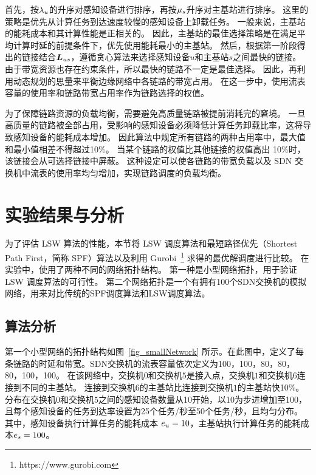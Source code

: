 首先，按${\lambda}_{u}$的升序对感知设备进行排序，再按${\mu}_{s}$升序对主基站进行排序。
这里的策略是优先从计算任务到达速度较慢的感知设备上卸载任务。
一般来说，主基站的能耗成本和其计算性能是正相关的。
因此，主基站的最佳选择策略是在满足平均计算时延的前提条件下，优先使用能耗最小的主基站。
然后，根据第一阶段得出的链接结合$\boldsymbol{L}_{us}$，遵循贪心算法来选择感知设备$u$和主基站$s$之间最快的链接。 
由于带宽资源也存在约束条件，所以最快的链路不一定是最佳选择。
因此，再利用动态规划的思量来平衡边缘网络中各链路的带宽占用。
在这一步中，使用流表容量的使用率和链路带宽占用率作为链路选择的权值。

为了保障链路资源的负载均衡，需要避免高质量链路被提前消耗完的窘境。
一旦高质量的链路被全部占用，受影响的感知设备必须降低计算任务卸载比率，这将导致感知设备的能耗成本增加。
因此算法中规定所有链路的两种占用率中，最大值和最小值相差不得超过10\%。
当某个链路的权值比其他链接的权值高出 10\%时，该链接会从可选择链接中屏蔽。
这种设定可以使各链路的带宽负载以及 SDN 交换机中流表的使用率均匀增加，实现链路调度的负载均衡。




\section{实验结果与分析}

为了评估 LSW 算法的性能，本节将 LSW 调度算法和最短路径优先（Shortest Path First，简称 SPF）算法以及利用 Gurobi~\footnote{https://www.gurobi.com} 求得的最优解调度进行比较。
在实验中，使用了两种不同的网络拓扑结构。
第一种是小型网络拓扑，用于验证 LSW 调度算法的可行性。
第二个网络拓扑是一个有拥有100个SDN交换机的模拟网络，用来对比传统的SPF调度算法和LSW调度算法。

\subsection{算法分析}

第一个小型网络的拓扑结构如图~\ref{fig_smallNetwork} 所示。在此图中，定义了每条链路的时延和带宽。SDN交换机的流表容量依次定义为100，100，80，80，80，100，100。
在该网络中，交换机$0$和交换机$5$是接入点，交换机$1$和交换机$6$连接到不同的主基站。
连接到交换机$6$的主基站比连接到交换机$1$的主基站快10\%。
分布在交换机$0$和交换机$5$之间的感知设备数量从10开始，以10为步进增加至100，且每个感知设备的任务到达率设置为25个任务/秒至50个任务/秒，且均匀分布。
其中，感知设备执行计算任务的能耗成本 $e_u=10$，主基站执行计算任务的能耗成本$e_s=100$。

